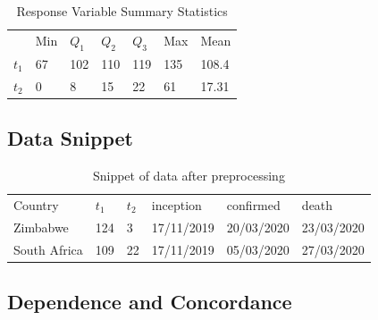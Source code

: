 \documentclass[]{report}
\begin{document}
\begin{table}[htb]
	\centering
	\caption{Response Variable Summary Statistics}
	\begin{tabular}{lllllll}
		& Min & $Q_1$ & $Q_2$ & $Q_3$ & Max & Mean  \\
		$t_1$ & 67  & 102   & 110   & 119   & 135 & 108.4 \\
		$t_2$ & 0   & 8     & 15    & 22    & 61  & 17.31
	\end{tabular}
\end{table}

\subsection*{Data Snippet}
\begin{table}[htb]
	\centering
	\caption{Snippet of data after preprocessing \cite{covidsa}}
	\label{snippet1}
	\begin{tabular}{llllll}
		Country      & $t_1$  & $t_2$ & inception  & confirmed  & death      \\
		Zimbabwe     & 124 & 3  & 17/11/2019 & 20/03/2020 & 23/03/2020 \\
		South Africa & 109 & 22 & 17/11/2019 & 05/03/2020 & 27/03/2020
	\end{tabular}
\end{table}

\newpage

\subsection{Dependence and Concordance}
\end{document}

